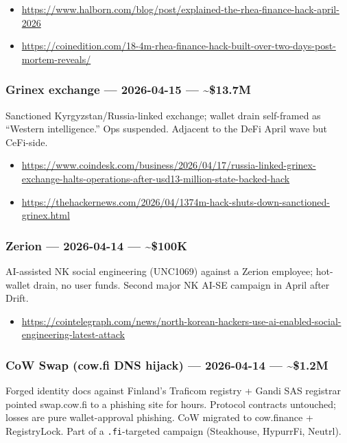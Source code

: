 \begin{itemize}
\tightlist
\item
  \url{https://www.halborn.com/blog/post/explained-the-rhea-finance-hack-april-2026}
\item
  \url{https://coinedition.com/18-4m-rhea-finance-hack-built-over-two-days-post-mortem-reveals/}
\end{itemize}

\subsubsection{Grinex exchange --- 2026-04-15 --- \textasciitilde\$13.7M}\label{grinex-exchange-2026-04-15-13.7m}

Sanctioned Kyrgyzstan/Russia-linked exchange; wallet drain self-framed as ``Western intelligence.'' Ops suspended. Adjacent to the DeFi April wave but CeFi-side.

\begin{itemize}
\tightlist
\item
  \url{https://www.coindesk.com/business/2026/04/17/russia-linked-grinex-exchange-halts-operations-after-usd13-million-state-backed-hack}
\item
  \url{https://thehackernews.com/2026/04/1374m-hack-shuts-down-sanctioned-grinex.html}
\end{itemize}

\subsubsection{Zerion --- 2026-04-14 --- \textasciitilde\$100K}\label{zerion-2026-04-14-100k}

AI-assisted NK social engineering (UNC1069) against a Zerion employee; hot-wallet drain, no user funds. Second major NK AI-SE campaign in April after Drift.

\begin{itemize}
\tightlist
\item
  \url{https://cointelegraph.com/news/north-korean-hackers-use-ai-enabled-social-engineering-latest-attack}
\end{itemize}

\subsubsection{CoW Swap (cow.fi DNS hijack) --- 2026-04-14 --- \textasciitilde\$1.2M}\label{cow-swap-cow.fi-dns-hijack-2026-04-14-1.2m}

Forged identity docs against Finland's Traficom registry + Gandi SAS registrar pointed swap.cow.fi to a phishing site for hours. Protocol contracts untouched; losses are pure wallet-approval phishing. CoW migrated to cow.finance + RegistryLock. Part of a \texttt{.fi}-targeted campaign (Steakhouse, HypurrFi, Neutrl).


